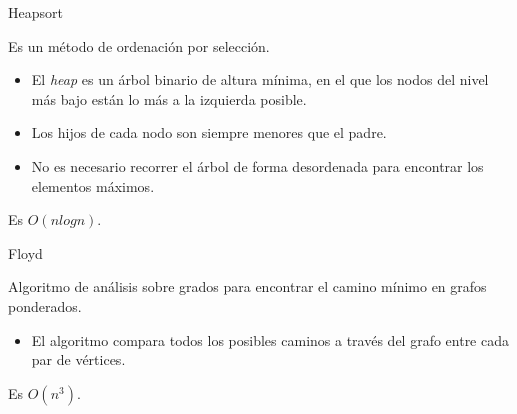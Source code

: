 \documentclass[spanish]{beamer}
\begin{document}
\begin{frame}{Heapsort}

	Es un método de ordenación por selección.

	\vskip 0.5cm
	
	\begin{itemize}
		\item El \textit{heap} es un árbol binario de altura mínima, en el que los nodos del nivel más bajo están lo más a la izquierda posible.
		\item Los hijos de cada nodo son siempre menores que el padre.
		\item No es necesario recorrer el árbol de forma desordenada para encontrar los elementos máximos.
	\end{itemize}
	
	\vskip 0.5cm
	
	Es $O(nlogn)$.
\end{frame}


\begin{frame}
	\begin{center}
		
	\end{center}
\end{frame}

\begin{frame}{Floyd}

	Algoritmo de análisis sobre grados para encontrar el camino mínimo en grafos ponderados.

	\vskip 0.5cm
	
	\begin{itemize}
		\item El algoritmo compara todos los posibles caminos a través del grafo entre cada par de vértices.
	\end{itemize}
	
	\vskip 0.5cm
	
	Es $O(n^3)$.
\end{frame}

\begin{frame}
	\begin{center}
		
	\end{center}
\end{frame}
\end{document}
